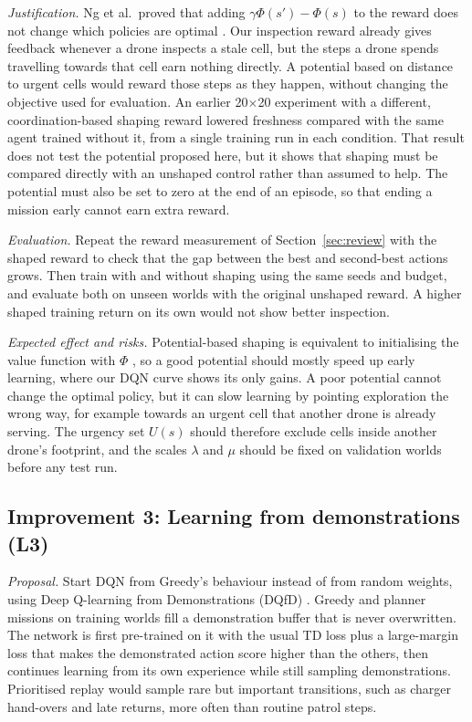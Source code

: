 \emph{Justification.} Ng et al.\ proved that adding $\gamma\Phi(s') - \Phi(s)$ to the
reward does not change which policies are optimal \cite{ng1999}. Our inspection reward already
gives feedback whenever a drone inspects a stale cell, but the steps a drone spends travelling
towards that cell earn nothing directly. A potential based on distance to urgent cells would
reward those steps as they happen, without changing the objective used for evaluation. An
earlier 20$\times$20 experiment with a different, coordination-based shaping reward lowered
freshness compared with the same agent trained without it, from a single training run in each
condition. That result does not test the potential proposed here, but it shows that shaping
must be compared directly with an unshaped control rather than assumed to help. The potential
must also be set to zero at the end of an episode, so that ending a mission early cannot earn
extra reward.

\emph{Evaluation.} Repeat the reward measurement of Section~\ref{sec:review} with the
shaped reward to check that the gap between the best and second-best actions grows. Then
train with and without shaping using the same seeds and budget, and evaluate both on unseen
worlds with the original unshaped reward. A higher shaped training return on its own would
not show better inspection.

\emph{Expected effect and risks.} Potential-based shaping is equivalent to initialising the
value function with $\Phi$ \cite{wiewiora2003}, so a good potential should mostly speed up early
learning, where our DQN curve shows its only gains. A poor potential cannot change the optimal
policy, but it can slow learning by pointing exploration the wrong way, for example towards
an urgent cell that another drone is already serving. The urgency set $U(s)$ should therefore
exclude cells inside another drone's footprint, and the scales $\lambda$ and $\mu$ should be
fixed on validation worlds before any test run.

\subsection{Improvement 3: Learning from demonstrations (L3)}

\emph{Proposal.} Start DQN from Greedy's behaviour instead of from random weights, using Deep
Q-learning from Demonstrations (DQfD) \cite{hester2018}. Greedy and planner missions on
training worlds fill a demonstration buffer that is never overwritten. The network is first
pre-trained on it with the usual TD loss plus a large-margin loss that makes the demonstrated
action score higher than the others, then continues learning from its own experience while
still sampling demonstrations. Prioritised replay \cite{schaul2016} would sample rare but
important transitions, such as charger hand-overs and late returns, more often than routine
patrol steps.

